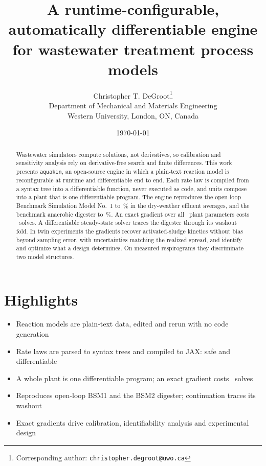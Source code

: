 \documentclass{article}
\title{A runtime-configurable, automatically differentiable engine for
wastewater treatment process models}
\author{%
  Christopher T. DeGroot\thanks{Corresponding author: \texttt{christopher.degroot@uwo.ca}} \\
  Department of Mechanical and Materials Engineering \\
  Western University, London, ON, Canada \\
}
\date{\today}
\begin{document}
\maketitle

\begin{abstract}
Wastewater simulators compute solutions, not derivatives, so calibration and sensitivity analysis rely on derivative-free search and finite differences. This work presents \texttt{aquakin}, an open-source engine in which a plain-text reaction model is reconfigurable at runtime and differentiable end to end. Each rate law is compiled from a syntax tree into a differentiable function, never executed as code, and units compose into a plant that is one differentiable program. The engine reproduces the open-loop Benchmark Simulation Model No.~1 to \DynEffWorstPct\,\% in the dry-weather effluent averages, and the benchmark anaerobic digester to \DigWorstPct\,\%. An exact gradient over all \PerfNparams\ plant parameters costs \PerfADFactor\ solves. A differentiable steady-state solver traces the digester through its washout fold. In twin experiments the gradients recover activated-sludge kinetics without bias beyond sampling error, with uncertainties matching the realized spread, and identify and optimize what a design determines. On measured respirograms they discriminate two model structures.
\end{abstract}

\section*{Highlights}
\begin{itemize}\setlength\itemsep{1pt}
\item Reaction models are plain-text data, edited and rerun with no code generation
\item Rate laws are parsed to syntax trees and compiled to JAX: safe and differentiable
\item A whole plant is one differentiable program; an exact gradient costs \PerfADFactor\ solves
\item Reproduces open-loop BSM1 and the BSM2 digester; continuation traces its washout
\item Exact gradients drive calibration, identifiability analysis and experimental design
\end{itemize}
\end{document}
